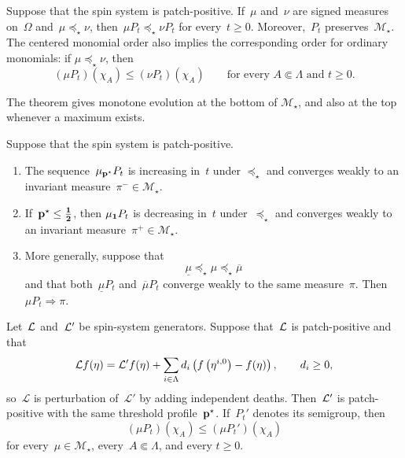 \documentclass[EJP,preprint,NODS,nobera]{ejpecp}
\begin{document}
\begin{theorem}
\label{thm:centered-monomial-monotonicity}
Suppose that the spin system is patch-positive. If~$\mu$ and~$\nu$ are signed measures on~$\Omega$ and~$\mu\preceq_\star\nu$, then~$\mu P_t\preceq_\star\nu P_t$ for every~$t\geq 0$.
Moreover,~$P_t$ preserves~$\mathcal M_\star$. The centered monomial order also
implies the corresponding order for ordinary monomials: if
$\mu\preceq_\star\nu$, then
\begin{equation}
\label{eq:ordinary-monomial-comparison}
(\mu P_t)(\chi_A)
\leq
(\nu P_t)(\chi_A)
\qquad
\text{for every }A\Subset\Lambda\text{ and }t\geq0.
\end{equation}
\end{theorem}

The theorem gives monotone evolution at the bottom of
$\mathcal M_\star$, and also at the top whenever a maximum exists.

\begin{corollary}
\label{cor:extremal-limits-comparison}
Suppose that the spin system is patch-positive.
\begin{enumerate}[label=\textup{(\roman*)}]
\item The sequence~$\mu_{\mathbf{p}^\star}P_t$ is increasing in~$t$ under
$\preceq_\star$ and converges weakly to an invariant measure~$\pi^-\in\mathcal M_\star$.

\item If~$\mathbf{p}^\star\leq\boldsymbol{\tfrac12}$, then
$\mu_{\mathbf{1}}P_t$ is decreasing in~$t$ under~$\preceq_\star$ and converges
weakly to an invariant measure~$\pi^+\in\mathcal M_\star$.

\item More generally, suppose that
\begin{equation*}
\underline\mu\preceq_\star\mu\preceq_\star\overline\mu
\end{equation*}
and that both~$\underline\mu P_t$ and~$\overline\mu P_t$ converge weakly to
the same measure~$\pi$. Then~$\mu P_t\Rightarrow\pi$.
\end{enumerate}
\end{corollary}

\begin{corollary}
\label{cor:pure-death-comparison-revision}
Let~$\mathcal{L}$ and~$\mathcal{L}'$ be spin-system generators. Suppose that~$\mathcal{L}$ is
patch-positive and that
\begin{equation}
\label{eq:pure-death-decomposition-revision}
\mathcal{L} f(\eta)
=
\mathcal{L}'f(\eta)
+
\sum_{i\in\Lambda}d_i
\left(f\left(\eta^{i,0}\right)-f(\eta)\right),
\qquad d_i\geq0,
\end{equation}
so~$\mathcal{L}$ is perturbation of~$\mathcal{L}'$ by adding independent deaths.
Then~$\mathcal{L}'$ is patch-positive with the same threshold profile~$\mathbf{p}^\star$.
If~$P_t'$ denotes its semigroup, then
\begin{equation}
\label{eq:pure-death-comparison-revision}
(\mu P_t)(\chi_A)
\leq
(\mu P_t')(\chi_A)
\end{equation}
for every~$\mu\in\mathcal M_\star$, every~$A\Subset\Lambda$, and every
$t\geq0$.
\end{corollary}
\end{document}
